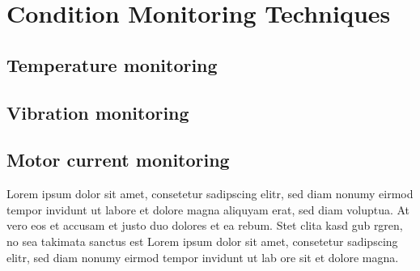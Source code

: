 	   
		
		

\section{Condition Monitoring Techniques}

\subsection{Temperature monitoring}
\subsection{Vibration monitoring}
\subsection{Motor current monitoring}


Lorem ipsum dolor sit amet, consetetur sadipscing elitr, sed diam nonumy eirmod tempor invidunt ut labore et dolore magna aliquyam erat, sed diam voluptua. At vero eos et accusam et justo duo dolores et ea rebum. Stet clita kasd gub rgren, no sea takimata sanctus est Lorem ipsum dolor sit amet, consetetur sadipscing elitr, sed diam nonumy eirmod tempor invidunt ut lab ore sit et dolore magna.

